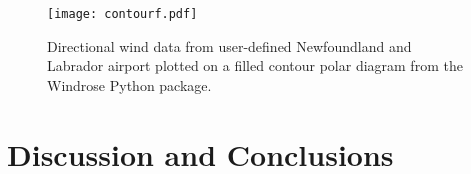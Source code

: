 \documentclass{article}
\begin{document}
\begin{figure}[h!]
\centering
\texttt{[image: contourf.pdf]}
\caption{Directional wind data from user-defined Newfoundland and Labrador airport plotted on a filled contour polar diagram from the Windrose Python package.}
\label{contourf}
\end{figure}

\clearpage
\section{Discussion and Conclusions}\label{Discussion_and_conclusions}


\clearpage 


\end{document}
